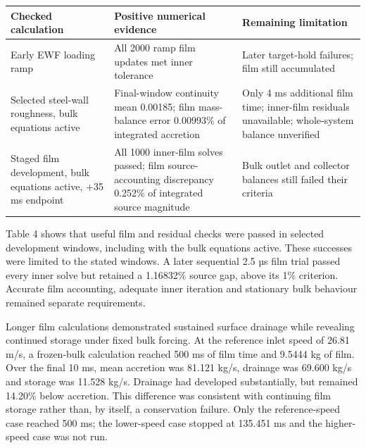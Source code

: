 \noindent\begin{minipage}{\linewidth}
\label{tab:table-4}
\begin{tabular}{@{}>{\raggedright\arraybackslash}p{0.29000000\dimexpr\linewidth-4\tabcolsep\relax}>{\raggedright\arraybackslash}p{0.34000000\dimexpr\linewidth-4\tabcolsep\relax}>{\raggedright\arraybackslash}p{0.37000000\dimexpr\linewidth-4\tabcolsep\relax}@{}}
\toprule
Checked calculation & Positive numerical evidence & Remaining limitation \\
\midrule
Early EWF loading ramp & All 2000 ramp film updates met inner tolerance & Later target-hold failures; film still accumulated \\
Selected steel-wall roughness, bulk equations active & Final-window continuity mean 0.00185; film mass-balance error 0.00993\% of integrated accretion & Only 4 ms additional film time; inner-film residuals unavailable; whole-system balance unverified \\
Staged film development, bulk equations active, +35 ms endpoint & All 1000 inner-film solves passed; film source-accounting discrepancy 0.252\% of integrated source magnitude & Bulk outlet and collector balances still failed their criteria \\
\bottomrule
\end{tabular}
\end{minipage}

Table 4 shows that useful film and residual checks were passed in selected development windows, including with the bulk equations active. These successes were limited to the stated windows. A later sequential 2.5 µs film trial passed every inner solve but retained a 1.16832\% source gap, above its 1\% criterion. Accurate film accounting, adequate inner iteration and stationary bulk behaviour remained separate requirements.

Longer film calculations demonstrated sustained surface drainage while revealing continued storage under fixed bulk forcing. At the reference inlet speed of 26.81 m/s, a frozen-bulk calculation reached 500 ms of film time and 9.5444 kg of film. Over the final 10 ms, mean accretion was 81.121 kg/s, drainage was 69.600 kg/s and storage was 11.528 kg/s. Drainage had developed substantially, but remained 14.20\% below accretion. This difference was consistent with continuing film storage rather than, by itself, a conservation failure. Only the reference-speed case reached 500 ms; the lower-speed case stopped at 135.451 ms and the higher-speed case was not run.

